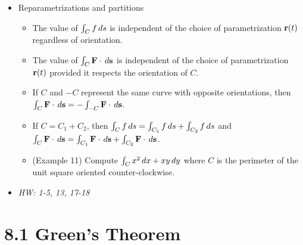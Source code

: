 \documentclass[11pt]{article}
\begin{document}
\begin{itemize}
\begin{itemize}
    \end{itemize}
  \item Reparametrizations and partitions
    \begin{itemize}
      \item The value of \(\int_C f\,d s\)
            is independent of the choice of parametrization \(\mathbf{r}(t)\)
            regardless of orientation.
      \item The value of \(\int_C \mathbf{F}\cdot\,d \mathbf{s}\)
            is independent of the choice of parametrization \(\mathbf{r}(t)\)
            provided it respects the orientation of \(C\).
      \item If \(C\) and \(-C\) represent the same curve with opposite
            orientations, then
            \(\int_C \mathbf{F}\cdot\,d\mathbf{s}=-\int_{-C}\mathbf{F}\cdot\,d\mathbf{s}\).
      \item If \(C=C_1+C_2\), then
            \(\int_C f\,d s=\int_{C_1}f\,d s+\int_{C_2}f\,d s\) and
            \(
              \int_C \mathbf{F}\cdot\,d \mathbf{s}
                =
              \int_{C_1}\mathbf{F}\cdot\,d \mathbf{s}+\int_{C_2}\mathbf{F}\cdot\,d \mathbf{s}
            \).
      \item (Example 11) Compute \(\int_C x^2\,d x+xy\,d y\) where
            \(C\) is the perimeter of the unit square oriented counter-clockwise.
    \end{itemize}
  \item\textit{
    HW: 1-5, 13, 17-18
  }
\end{itemize}



\section*{8.1 Green's Theorem}
\end{document}
